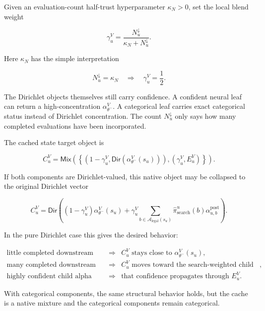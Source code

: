 \documentclass[11pt]{article}
\newcommand{\Legal}{\mathcal{A}_{\mathrm{legal}}}
\newcommand{\DirObj}{\mathsf{Dir}}
\newcommand{\MixObj}{\mathsf{Mix}}
\begin{document}
Given an evaluation-count half-trust hyperparameter \(\kappa_N>0\), set the
local blend weight

\[
\gamma^V_u
=
\frac{N^\downarrow_u}{\kappa_N+N^\downarrow_u}.
\]

Here \(\kappa_N\) has the simple interpretation

\[
N^\downarrow_u=\kappa_N
\quad\Longrightarrow\quad
\gamma^V_u=\frac12.
\]

The Dirichlet objects themselves still carry confidence. A confident neural leaf
can return a high-concentration \(\alpha^V_{\theta^-}\). A categorical leaf
carries exact categorical status instead of Dirichlet concentration. The count
\(N^\downarrow_u\) only says how many completed evaluations have been
incorporated.

The cached state target object is

\[
C^V_u
=
\MixObj
\left(
\left\{
(1-\gamma^V_u,\DirObj(\alpha_{\theta^-}^V(s_u))),
(\gamma^V_u,E^V_u)
\right\}
\right).
\]

If both components are Dirichlet-valued, this native object may be collapsed to
the original Dirichlet vector

\[
C^V_u
=
\DirObj\left(
(1-\gamma^V_u)\alpha_{\theta^-}^V(s_u)
+
\gamma^V_u
\sum_{b\in\Legal(s_u)}
\hat\pi_{\mathrm{search}}^u(b)
\alpha^{\mathrm{post}}_{u,b}
\right).
\]

In the pure Dirichlet case this gives the desired behavior:

\[
\begin{array}{rcl}
\text{little completed downstream work} &\Rightarrow&
C^V_u \text{ stays close to } \alpha_{\theta^-}^V(s_u),\\[2pt]
\text{many completed downstream evaluations} &\Rightarrow&
C^V_u \text{ moves toward the search-weighted child posterior},\\[2pt]
\text{highly confident child alpha} &\Rightarrow&
\text{that confidence propagates through } E^V_u.
\end{array}
\]

With categorical components, the same structural behavior holds, but the cache
is a native mixture and the categorical components remain categorical.
\end{document}
